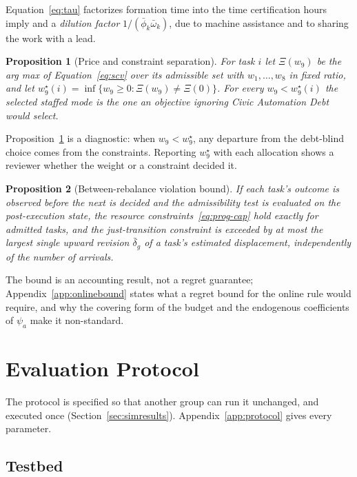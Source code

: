 \documentclass[utf8]{FrontiersinHarvard}
\newtheorem{Proposition}{Proposition}
\begin{document}
	Equation~\eqref{eq:tau} factorizes formation time into the time certification hours imply and a \textit{dilution factor} $1/(\bar\phi_k\bar\omega_k)$, due to machine assistance and to sharing the work with a lead.

	\begin{Proposition}[Price and constraint separation]
		\label{prop:price}
		For task $i$ let $\Xi(w_9)$ be the arg max of Equation~\eqref{eq:scv} over its admissible set with $w_1,\ldots,w_8$ in fixed ratio, and let $w_9^\star(i)=\inf\{w_9\ge 0:\Xi(w_9)\ne\Xi(0)\}$. For every $w_9<w_9^\star(i)$ the selected staffed mode is the one an objective ignoring Civic Automation Debt would select.
	\end{Proposition}

	Proposition~\ref{prop:price} is a diagnostic: when $w_9<w_9^\star$, any departure from the debt-blind choice comes from the constraints. Reporting $w_9^\star$ with each allocation shows a reviewer whether the weight or a constraint decided it.

	\begin{Proposition}[Between-rebalance violation bound]
		\label{prop:violation}
		If each task's outcome is observed before the next is decided and the admissibility test is evaluated on the post-execution state, the resource constraints~\eqref{eq:prog-cap} hold exactly for admitted tasks, and the just-transition constraint is exceeded by at most the largest single upward revision $\bar\delta_g$ of a task's estimated displacement, independently of the number of arrivals.
	\end{Proposition}

	The bound is an accounting result, not a regret guarantee; Appendix~\ref{app:onlinebound} states what a regret bound for the online rule would require, and why the covering form of the budget and the endogenous coefficients of $\psi_a$ make it non-standard.

	\section{Evaluation Protocol}
	\label{sec:protocol}

	The protocol is specified so that another group can run it unchanged, and executed once (Section~\ref{sec:simresults}). Appendix~\ref{app:protocol} gives every parameter.

	\subsection{Testbed}
	\label{sec:testbed}
\end{document}
